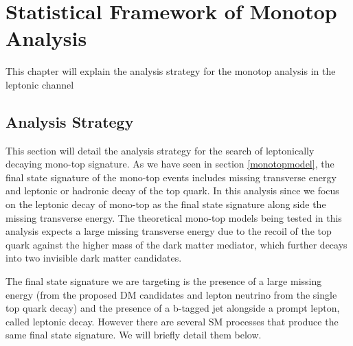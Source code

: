\chapter{Statistical Framework of Monotop Analysis}
\label{chapter:five}
This chapter will explain the analysis strategy for the monotop analysis in the leptonic channel
\section{Analysis Strategy}\label{analysis-strategy}

This section will detail the analysis strategy for the search of leptonically decaying mono-top signature. As we have seen in section \ref{monotopmodel}, the final state signature of the mono-top events includes missing transverse energy and leptonic or hadronic decay of the top quark. In this analysis since we focus on the leptonic decay of mono-top as the final state signature along side the missing transverse energy. The theoretical mono-top models being tested in this analysis expects a large missing transverse energy due to the recoil of the top quark against the higher mass of the dark matter mediator, which further decays into two invisible dark matter candidates.

The final state signature we are targeting is the presence of a large missing energy (from the proposed DM candidates and lepton neutrino from the single top quark decay) and the presence of a b-tagged jet alongside a prompt lepton, called leptonic decay. However there are several SM processes that produce the same final state signature. We will briefly detail them below.

